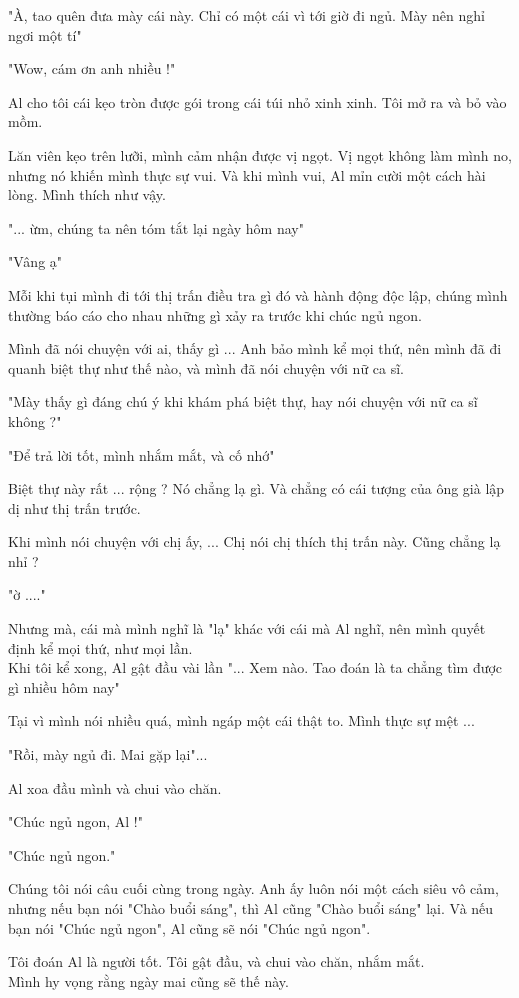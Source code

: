 "À, tao quên đưa mày cái này. Chỉ có một cái vì tới giờ đi ngủ. Mày nên nghỉ ngơi một tí"

"Wow, cám ơn anh nhiều !"

Al cho tôi cái kẹo tròn được gói trong cái túi nhỏ xinh xinh. Tôi mở ra và bỏ vào mồm.

Lăn viên kẹo trên lưỡi, mình cảm nhận được vị ngọt. Vị ngọt không làm mình no, nhưng nó khiến mình thực sự vui. Và khi mình vui, Al mỉn cười một cách hài lòng. Mình thích như vậy.

"... ừm, chúng ta nên tóm tắt lại ngày hôm nay"

"Vâng ạ"

Mỗi khi tụi mình đi tới thị trấn điều tra gì đó và hành động độc lập, chúng mình thường báo cáo cho nhau những gì xảy ra trước khi chúc ngủ ngon.

Mình đã nói chuyện với ai, thấy gì ... Anh bảo mình kể mọi thứ, nên mình đã đi quanh biệt thự như thế nào, và mình đã nói chuyện với nữ ca sĩ.

"Mày thấy gì đáng chú ý khi khám phá biệt thự, hay nói chuyện với nữ ca sĩ không ?"

"Để trả lời tốt, mình nhắm mắt, và cố nhớ"

Biệt thự này rất ... rộng ? Nó chẳng lạ gì. Và chẳng có cái tượng của ông già lập dị như thị trấn trước.

Khi mình nói chuyện với chị ấy, ... Chị nói chị thích thị trấn này. Cũng chẳng lạ nhỉ ?

"ờ ...."

Nhưng mà, cái mà mình nghĩ là "lạ" khác với cái mà Al nghĩ, nên mình quyết định kể mọi thứ, như mọi lần. \\


Khi tôi kể xong, Al gật đầu vài lần "... Xem nào. Tao đoán là ta chẳng tìm được gì nhiều hôm nay"

Tại vì mình nói nhiều quá, mình ngáp một cái thật to. Mình thực sự mệt ...

"Rồi, mày ngủ đi. Mai gặp lại"...

Al xoa đầu mình và chui vào chăn.

"Chúc ngủ ngon, Al !"

"Chúc ngủ ngon."

Chúng tôi nói câu cuối cùng trong ngày. Anh ấy luôn nói một cách siêu vô cảm, nhưng nếu bạn nói "Chào buổi sáng", thì Al cũng "Chào buổi sáng" lại. Và nếu bạn nói "Chúc ngủ ngon", Al cũng sẽ nói "Chúc ngủ ngon".

Tôi đoán Al là người tốt. Tôi gật đầu, và chui vào chăn, nhắm mắt.\\

Mình hy vọng rằng ngày mai cũng sẽ thế này. \\



